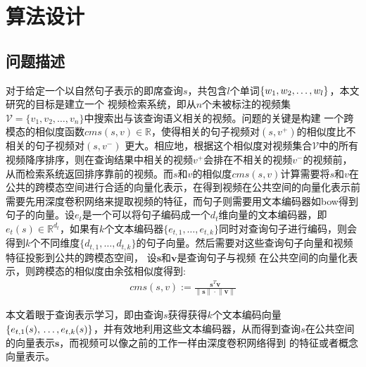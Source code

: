 \chapter{算法设计}

\section{问题描述}
对于给定一个以自然句子表示的即席查询$s$，共包含$l$个单词$\{w_1,w_2,\ldots,\\w_l\}$，本文研究的目标是建立一个
视频检索系统，即从$n$个未被标注的视频集$\mathcal{V}=\{v_1,v_2,\ldots,v_n\}$中搜索出与该查询语义相关的视频。问题的关键是构建
一个跨模态的相似度函数$cms(s,v) \in \mathbb{R}$，使得相关的句子视频对$(s,v^+)$的相似度比不相关的句子视频对$(s,v^-)$
更大。相应地，根据这个相似度对视频集合$\mathcal{V}$中的所有视频降序排序，则在查询结果中相关的视频$v^+$会排在不相关的视频$v^-$的视频前，从而检索系统返回排序靠前的视频。而$s$和$v$的相似度$cms(s,v)$计算需要将$s$和$v$在公共的跨模态空间进行合适的向量化表示，在得到视频在公共空间的向量化表示前需要先用深度卷积网络来提取视频的特征，而句子则需要用文本编码器如bow得到句子的向量。设$e_t$是一个可以将句子编码成一个$d_t$维向量的文本编码器，即$e_t(s) \in \mathbb{R}^{d_t}$，如果有$k$个文本编码器$\{e_{t,1},\ldots,e_{t,k}\}$同时对查询句子进行编码，则会得到$k$个不同维度$\{d_{t,1},\ldots,d_{t,k}\}$的句子向量。然后需要对这些查询句子向量和视频特征投影到公共的跨模态空间，
设$\mathbf{s}$和$\mathbf{v}$是查询句子与视频
在公共空间的向量化表示，则跨模态的相似度由余弦相似度得到:
\begin{equation}
    \label{eq:cosine-sim}
    \begin{aligned}
        cms(s,v) := \frac{\mathbf{s}^T\mathbf{v}}{\left\| \mathbf{s} \right\| \cdot \left\| \mathbf{v} \right\|}
    \end{aligned}
\end{equation}

本文着眼于查询表示学习，即由查询$s$获得获得$k$个文本编码向量$\{e_{t,1}(s),\\ \ldots,e_{t,k}(s)\}$，并有效地利用这些文本编码器，从而得到查询$s$在公共空间的向量表示$\mathbf{s}$，而视频可以像之前的工作一样由深度卷积网络得到
的特征或者概念向量表示。

